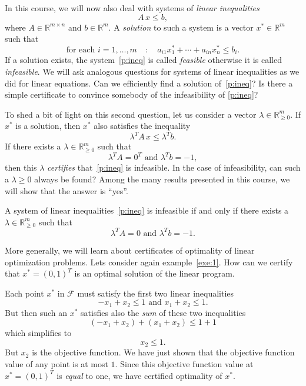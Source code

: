 In this course, we will now also deal with systems of \emph{linear inequalities} 
\begin{equation}
  \label{p:ineq}
  A \,x ≤ b,
\end{equation}
where $A ∈ ℝ^{m × n}$ and $b ∈ ℝ^m$. A \emph{solution} to such a system is a vector $x^* ∈ ℝ^m$ such that
\begin{equation}
  \label{p:sol}
 \text{for each } i=1,\dots,m \quad : \quad   a_{i1} x^*_1 + \cdots + a_{in} x^*_n \leq b_i.  
\end{equation}
If a solution exists, the system~\eqref{p:ineq} is called \emph{feasible} otherwise it is called \emph{infeasible}. 
We will ask analogous questions for  systems of linear inequalities as we did for linear equations. Can we efficiently find a solution of~\eqref{p:ineq}?  Is there a simple certificate to convince somebody of the infeasibility of \eqref{p:ineq}? 

To shed a bit of light on this second question, let us consider a vector $λ ∈ ℝ^m_{≥0}$. If $x^*$ is a solution, then $x^*$ also satisfies the inequality 
\begin{equation}
  \label{p:impli}
  λ^T A \, x ≤ λ^T b.
\end{equation}
If there exists a $λ \in ℝ^m_{≥0}$ such that 
\begin{equation}
  \label{p:Farkas} 
  λ^T A = 0^T \text{ and } λ^T b = -1,
\end{equation}
then this $λ$ \emph{certifies} that~\eqref{p:ineq} is infeasible. In the case of infeasibility, can such a $λ≥0$ always be found? Among the many results presented in  this course,  we will show that the answer is ``yes''. 
\begin{theorem}
  \label{thr:7}
  A system of linear inequalities~\eqref{p:ineq} is infeasible if and only if there exists a $λ ∈ ℝ^m_{≥0}$ such that 
  \begin{displaymath}
    λ^T A = 0 \text{ and } λ^T b = -1.
  \end{displaymath}
\end{theorem}


\bigskip

More generally, we will learn about certificates of optimality of linear optimization problems. Lets consider again example~\ref{exe:1}. How can we certify that $x^* = (0,1)^T$ is an optimal solution of the linear program.

Each point $x^*$ in $ℱ$ must satisfy the first two linear inequalities
\begin{displaymath}
  -x_1 + x_2 ≤ 1 \text{ and }  x_1 + x_2 ≤ 1. 
\end{displaymath}
But then such an $x^*$ satisfies also the \emph{sum} of these two inequalities
\begin{displaymath}
   (-x_1 + x_2) + (x_1 + x_2) ≤ 1  +1 
 \end{displaymath}
 which simplifies to
 \begin{displaymath}
x_2 ≤1. 
 \end{displaymath}
 But $x_2$ is the objective function. We have just shown that the objective function value of any point is at most $1$. Since this objective function value at $x^* = (0,1)^T$ is \emph{equal} to one, we have certified optimality of $x^*$.

